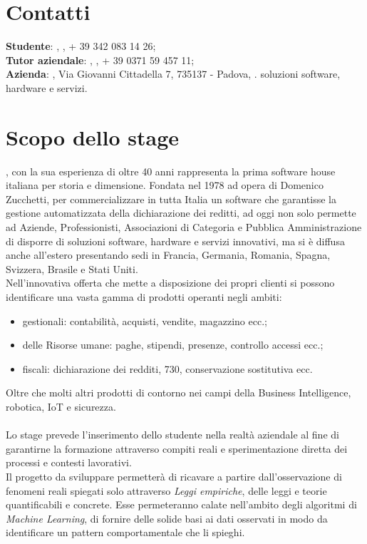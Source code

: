 \section{Contatti}
\textbf{Studente}: \myName, , + 39 342 083 14 26;\\
\textbf{Tutor aziendale}: \Greg, , + 39 0371 59 457 11;\\
\textbf{Azienda}: \myCompany, Via Giovanni Cittadella 7, 735137 - Padova, \sitoCompany.
soluzioni software, hardware e servizi. 

\section{Scopo dello stage}
\textit{\myCompany}, con la sua esperienza di oltre 40 anni rappresenta la prima software house italiana per storia e dimensione. Fondata nel 1978 ad opera di Domenico Zucchetti, per commercializzare in tutta Italia un software che garantisse la gestione automatizzata della dichiarazione dei reditti, ad oggi non solo permette ad Aziende, Professionisti, Associazioni di Categoria e Pubblica Amministrazione di disporre di  soluzioni software, hardware e servizi innovativi, ma si è diffusa anche all'estero presentando sedi in Francia, Germania, Romania, Spagna, Svizzera, Brasile e Stati Uniti.\\ Nell'innovativa offerta che \textit{\myCompany{}} mette a disposizione dei propri clienti si possono identificare una vasta gamma di prodotti operanti negli ambiti:
\begin{itemize}
\item gestionali: contabilità, acquisti, vendite, magazzino ecc.;
\item delle Risorse umane: paghe, stipendi, presenze, controllo accessi ecc.;
\item fiscali: dichiarazione dei redditi, 730, conservazione sostitutiva ecc.
\end{itemize}
Oltre che molti altri prodotti di contorno nei campi della Business Intelligence, robotica, IoT e  sicurezza.
\\\\
Lo stage prevede l'inserimento dello studente nella realtà aziendale al fine di garantirne la formazione attraverso compiti reali e sperimentazione diretta dei processi e contesti lavorativi. \\
Il progetto da sviluppare permetterà di ricavare a partire dall'osservazione di fenomeni reali spiegati solo attraverso \textit{Leggi empiriche}, delle leggi e teorie quantificabili e concrete. Esse permeteranno calate nell'ambito degli algoritmi di \textit{Machine Learning}, di fornire delle solide basi ai dati osservati in modo da identificare un pattern comportamentale che li spieghi.
